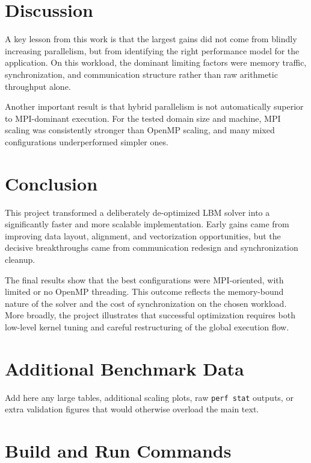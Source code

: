 \documentclass[11pt,a4paper]{article}
\begin{document}
\section{Discussion}

A key lesson from this work is that the largest gains did not come from blindly increasing parallelism, but from identifying the right performance model for the application. On this workload, the dominant limiting factors were memory traffic, synchronization, and communication structure rather than raw arithmetic throughput alone.

Another important result is that hybrid parallelism is not automatically superior to MPI-dominant execution. For the tested domain size and machine, MPI scaling was consistently stronger than OpenMP scaling, and many mixed configurations underperformed simpler ones.

\section{Conclusion}

This project transformed a deliberately de-optimized LBM solver into a significantly faster and more scalable implementation. Early gains came from improving data layout, alignment, and vectorization opportunities, but the decisive breakthroughs came from communication redesign and synchronization cleanup.

The final results show that the best configurations were MPI-oriented, with limited or no OpenMP threading. This outcome reflects the memory-bound nature of the solver and the cost of synchronization on the chosen workload. More broadly, the project illustrates that successful optimization requires both low-level kernel tuning and careful restructuring of the global execution flow.

\appendix

\section{Additional Benchmark Data}

Add here any large tables, additional scaling plots, raw \texttt{perf stat} outputs, or extra validation figures that would otherwise overload the main text.

\section{Build and Run Commands}
\end{document}
